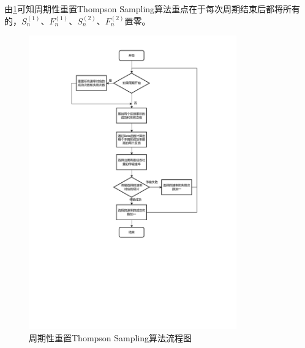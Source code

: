由\ref{置零流程图}可知周期性重置Thompson Sampling算法重点在于每次周期结束后都将所有的，$S_{n}^{(1)}$、$F_{n}^{(1)}$、$S_{n}^{(2)}$、$F_{n}^{(2)}$置零。

\begin{figure}[h]
	\centering
	\includegraphics[width=0.8\textwidth]{figure/置零流程图.pdf}
	\caption{周期性重置Thompson Sampling算法流程图}
	\label{置零流程图}
\end{figure}

